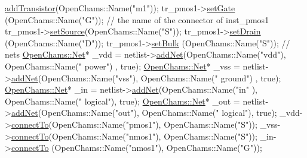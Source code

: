 \begin{DoxyCodeInclude}
      \mbox{\hyperlink{class_open_chams_1_1_device_ad45d34f8765dd113a5b12289efe66c07}{addTransistor}}(OpenChams::Name(\textcolor{stringliteral}{"m1"}));
    tr\_pmos1->\mbox{\hyperlink{class_open_chams_1_1_transistor_a705b53a51f0e265533b228f6e8beaf50}{setGate}}  (OpenChams::Name(\textcolor{stringliteral}{"G"})); \textcolor{comment}{// the name of the connector of inst\_pmos1}
    tr\_pmos1->\mbox{\hyperlink{class_open_chams_1_1_transistor_abc4a5d86e639ea13e27551722e2f9c17}{setSource}}(OpenChams::Name(\textcolor{stringliteral}{"S"}));
    tr\_pmos1->\mbox{\hyperlink{class_open_chams_1_1_transistor_a72ff8491040e3fdc1c8bd62b2392ab82}{setDrain}} (OpenChams::Name(\textcolor{stringliteral}{"D"}));
    tr\_pmos1->\mbox{\hyperlink{class_open_chams_1_1_transistor_a1484abe63e3f8ffbc2911c5230fa7091}{setBulk}}  (OpenChams::Name(\textcolor{stringliteral}{"S"}));
    \textcolor{comment}{//  nets}
    \mbox{\hyperlink{class_open_chams_1_1_net}{OpenChams::Net}}* \_vdd = netlist->\mbox{\hyperlink{class_open_chams_1_1_netlist_a52be455a704925328843770552eca43d}{addNet}}(OpenChams::Name(\textcolor{stringliteral}{"vdd"}), OpenChams::Name(\textcolor{stringliteral}{"
      power"})  , \textcolor{keyword}{true});
    \mbox{\hyperlink{class_open_chams_1_1_net}{OpenChams::Net}}* \_vss = netlist->\mbox{\hyperlink{class_open_chams_1_1_netlist_a52be455a704925328843770552eca43d}{addNet}}(OpenChams::Name(\textcolor{stringliteral}{"vss"}), OpenChams::Name(\textcolor{stringliteral}{"
      ground"}) , \textcolor{keyword}{true});
    \mbox{\hyperlink{class_open_chams_1_1_net}{OpenChams::Net}}* \_in  = netlist->\mbox{\hyperlink{class_open_chams_1_1_netlist_a52be455a704925328843770552eca43d}{addNet}}(OpenChams::Name(\textcolor{stringliteral}{"in"} ), OpenChams::Name(\textcolor{stringliteral}{"
      logical"}), \textcolor{keyword}{true});
    \mbox{\hyperlink{class_open_chams_1_1_net}{OpenChams::Net}}* \_out = netlist->\mbox{\hyperlink{class_open_chams_1_1_netlist_a52be455a704925328843770552eca43d}{addNet}}(OpenChams::Name(\textcolor{stringliteral}{"out"}), OpenChams::Name(\textcolor{stringliteral}{"
      logical"}), \textcolor{keyword}{true});
    \_vdd->\mbox{\hyperlink{class_open_chams_1_1_net_a40c2c019175ba3bfa4b90f4ad5d06483}{connectTo}}(OpenChams::Name(\textcolor{stringliteral}{"pmos1"}), OpenChams::Name(\textcolor{stringliteral}{"S"}));
    \_vss->\mbox{\hyperlink{class_open_chams_1_1_net_a40c2c019175ba3bfa4b90f4ad5d06483}{connectTo}}(OpenChams::Name(\textcolor{stringliteral}{"nmos1"}), OpenChams::Name(\textcolor{stringliteral}{"S"}));
    \_in->\mbox{\hyperlink{class_open_chams_1_1_net_a40c2c019175ba3bfa4b90f4ad5d06483}{connectTo}} (OpenChams::Name(\textcolor{stringliteral}{"nmos1"}), OpenChams::Name(\textcolor{stringliteral}{"G"}));

\end{DoxyCodeInclude}
